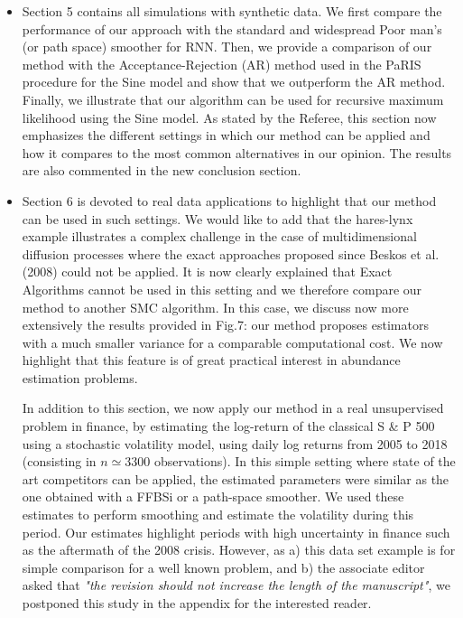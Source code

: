 \documentclass{article}
\begin{document}
\begin{itemize}
    \item Section 5 contains all simulations with synthetic data. We first compare the performance of our approach with the standard and widespread Poor man's (or path space) smoother for RNN. Then, we provide a comparison of our method with the  Acceptance-Rejection (AR) method used in the PaRIS procedure for the Sine model and show that we outperform the AR method. Finally, we illustrate that our algorithm can be used for recursive maximum likelihood using the Sine model. As stated by the Referee, this section now emphasizes the different settings in which our method can be applied and how it compares to the most common alternatives in our opinion. The results are also commented in the new conclusion section.
    \item Section 6 is devoted to real data applications to highlight that our method can be used in such settings. 
    We would like to add that the hares-lynx example illustrates a complex challenge in the case of multidimensional diffusion processes where the exact approaches proposed since Beskos et al. (2008) could not be applied. It is now clearly explained that Exact Algorithms cannot be used in this setting and we therefore compare our method to another SMC algorithm.  In this case, we discuss now more extensively the results provided in Fig.7: our method proposes estimators with a much smaller variance for a comparable computational cost. We now highlight that this feature is of great practical interest in abundance estimation problems.
    
    In addition to this section, we now apply our method in a real unsupervised problem in finance, by estimating the log-return of the classical S \& P 500 using a stochastic volatility model, using daily log returns from 2005 to 2018 (consisting in $n \simeq 3300$ observations). 
    In this simple setting where state of the art competitors can be applied, the estimated parameters were similar as the one obtained with a FFBSi or a path-space smoother. 
    We used these estimates to perform smoothing and estimate the volatility during this period. 
    Our estimates highlight periods with high uncertainty in finance such as the aftermath of the 2008 crisis.
    However, as a) this data set example is for simple comparison for a well known problem, and b) the associate editor asked that  \textit{"the revision should not increase the length of the manuscript"}, we postponed this study in the appendix for the interested reader.
\end{itemize}
\end{document}
